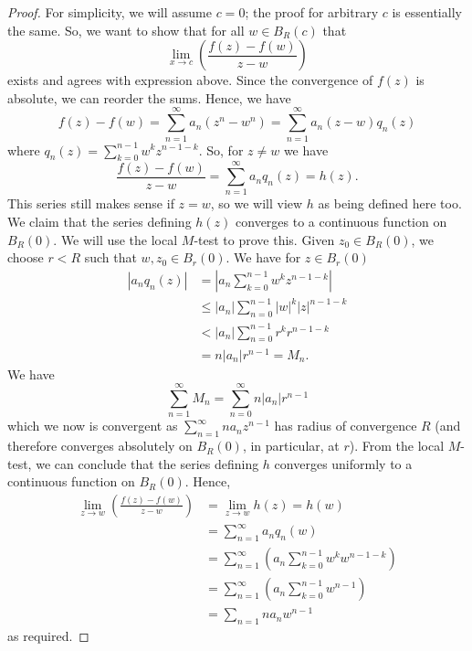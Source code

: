 \begin{proof}
    For simplicity, we will assume $c = 0$; 
    the proof for arbitrary $c$ is essentially the same.
    So, we want to show that for all $w \in B_R(c)$ that
    \[ \lim_{x \to c} \left(\frac{f(z) - f(w)}{z - w}\right) \]
    exists and agrees with expression above.
    Since the convergence of $f(z)$ is absolute, we can reorder the sums.
    Hence, we have
    \[ f(z) - f(w) =
        \sum_{n = 1}^\infty a_n (z^n - w^n) =
        \sum_{n = 1}^\infty a_n (z - w) q_n(z) \]
    where $q_n(z) = \sum_{k = 0}^{n - 1} w^k z^{n - 1 - k}$.
    So, for $z \neq w$ we have
    \[ \frac{f(z) - f(w)}{z - w} = \sum_{n = 1}^\infty a_n q_n(z) = h(z). \]
    This series still makes sense if $z = w$, so we will view $h$ as being defined here too.
    We claim that the series defining $h(z)$ converges to a continuous function on $B_R(0)$. 
    We will use the local $M$-test to prove this.
    Given $z_0 \in B_R(0)$, we choose $r < R$ such that $w, z_0 \in B_r(0)$.
    We have for $z \in B_r(0)$
    \begin{align*}
        \left\lvert a_n q_n(z) \right\rvert 
        &=    \left\lvert a_n \sum_{k = 0}^{n - 1} w^k z^{n - 1 - k} \right\rvert \\
        &\leq \lvert a_n \rvert \sum_{n = 0}^{n - 1} \lvert w \rvert^k \lvert z \rvert^{n - 1 - k} \\
        &<    \lvert a_n \rvert \sum_{n = 0}^{n - 1} r^k r^{n - 1 - k} \\
        &=    n \lvert a_n \rvert r^{n - 1} = M_n.
    \end{align*}
    We have 
    \[ \sum_{n = 1}^\infty M_n = \sum_{n = 0}^\infty n \lvert a_n \rvert r^{n - 1} \]
    which we now is convergent as 
    $\sum_{n = 1}^\infty n a_n z^{n - 1}$ 
    has radius of convergence $R$ 
    (and therefore converges absolutely on $B_R(0)$, in particular, at $r$).
    From the local $M$-test, 
    we can conclude that the series defining $h$ converges uniformly
    to a continuous function on $B_R(0)$.
    Hence,
    \begin{align*}
        \lim_{z \to w} \left(\frac{f(z) - f(w)}{z - w}\right) 
        &= \lim_{z \to w} h(z) 
         = h(w) \\
        &= \sum_{n = 1}^\infty a_n q_n(w) \\
        &= \sum_{n = 1}^\infty \left(a_n \sum_{k = 0}^{n - 1} w^k w^{n - 1 - k}\right) \\
        &= \sum_{n = 1}^\infty \left(a_n \sum^{n - 1}_{k = 0} w^{n - 1}\right) \\
        &= \sum_{n = 1} n a_n w^{n - 1}
    \end{align*}
    as required.
\end{proof}

